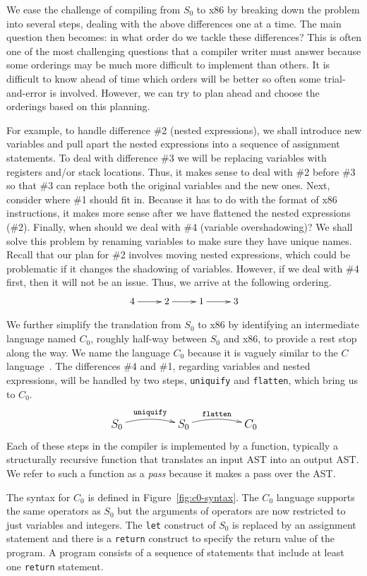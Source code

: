 \documentclass[12pt]{book}
\newcommand{\key}[1]{\texttt{#1}}
\begin{document}
We ease the challenge of compiling from $S_0$ to x86 by breaking down
the problem into several steps, dealing with the above differences one
at a time. The main question then becomes: in what order do we tackle
these differences? This is often one of the most challenging questions
that a compiler writer must answer because some orderings may be much
more difficult to implement than others. It is difficult to know ahead
of time which orders will be better so often some trial-and-error is
involved. However, we can try to plan ahead and choose the orderings
based on this planning.

For example, to handle difference \#2 (nested expressions), we shall
introduce new variables and pull apart the nested expressions into a
sequence of assignment statements.  To deal with difference \#3 we
will be replacing variables with registers and/or stack
locations. Thus, it makes sense to deal with \#2 before \#3 so that
\#3 can replace both the original variables and the new ones. Next,
consider where \#1 should fit in. Because it has to do with the format
of x86 instructions, it makes more sense after we have flattened the
nested expressions (\#2). Finally, when should we deal with \#4
(variable overshadowing)?  We shall solve this problem by renaming
variables to make sure they have unique names. Recall that our plan
for \#2 involves moving nested expressions, which could be problematic
if it changes the shadowing of variables. However, if we deal with \#4
first, then it will not be an issue.  Thus, we arrive at the following
ordering.
\[
\xymatrix{
4 \ar[r] & 2 \ar[r] & 1 \ar[r] & 3
}
\]

We further simplify the translation from $S_0$ to x86 by identifying
an intermediate language named $C_0$, roughly half-way between $S_0$
and x86, to provide a rest stop along the way. We name the language
$C_0$ because it is vaguely similar to the $C$
language~\citep{Kernighan:1988nx}. The differences \#4 and \#1,
regarding variables and nested expressions, will be handled by two
steps, \key{uniquify} and \key{flatten}, which bring us to
$C_0$.
\[\large
\xymatrix@=50pt{
  S_0 \ar@/^/[r]^-{\key{uniquify}} & 
  S_0 \ar@/^/[r]^-{\key{flatten}} &
  C_0 
}
\]
Each of these steps in the compiler is implemented by a function,
typically a structurally recursive function that translates an input
AST into an output AST. We refer to such a function as a \emph{pass}
because it makes a pass over the AST.

The syntax for $C_0$ is defined in Figure~\ref{fig:c0-syntax}.  The
$C_0$ language supports the same operators as $S_0$ but the arguments
of operators are now restricted to just variables and integers. The
\key{let} construct of $S_0$ is replaced by an assignment statement
and there is a \key{return} construct to specify the return value of
the program. A program consists of a sequence of statements that
include at least one \key{return} statement.
\end{document}
